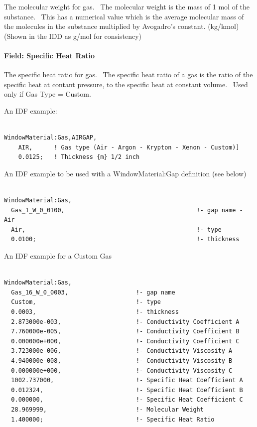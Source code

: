 The molecular weight for gas.~ The molecular weight is the mass of 1 mol of the substance.~ This has a numerical value which is the average molecular mass of the molecules in the substance multiplied by Avogadro's constant. (kg/kmol) (Shown in the IDD as g/mol for consistency)

\paragraph{Field: Specific Heat Ratio}\label{field-specific-heat-ratio-1}

The specific heat ratio for gas.~ The specific heat ratio of a gas is the ratio of the specific heat at contant pressure, to the specific heat at constant volume.~ Used only if Gas Type = Custom.

An IDF example:

\begin{lstlisting}

WindowMaterial:Gas,AIRGAP,
    AIR,      ! Gas type (Air - Argon - Krypton - Xenon - Custom)]
    0.0125;   ! Thickness {m} 1/2 inch
\end{lstlisting}

An IDF example to be used with a WindowMaterial:Gap definition (see below)

\begin{lstlisting}

WindowMaterial:Gas,
  Gas_1_W_0_0100,                                     !- gap name - Air
  Air,                                                !- type
  0.0100;                                             !- thickness
\end{lstlisting}

An IDF example for a Custom Gas

\begin{lstlisting}

WindowMaterial:Gas,
  Gas_16_W_0_0003,                   !- gap name
  Custom,                            !- type
  0.0003,                            !- thickness
  2.873000e-003,                     !- Conductivity Coefficient A
  7.760000e-005,                     !- Conductivity Coefficient B
  0.000000e+000,                     !- Conductivity Coefficient C
  3.723000e-006,                     !- Conductivity Viscosity A
  4.940000e-008,                     !- Conductivity Viscosity B
  0.000000e+000,                     !- Conductivity Viscosity C
  1002.737000,                       !- Specific Heat Coefficient A
  0.012324,                          !- Specific Heat Coefficient B
  0.000000,                          !- Specific Heat Coefficient C
  28.969999,                         !- Molecular Weight
  1.400000;                          !- Specific Heat Ratio
\end{lstlisting}

